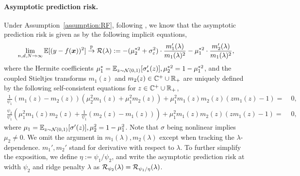 \documentclass{article} %
\begin{document}
\paragraph{Asymptotic prediction risk.} 
Under Assumption~\ref{assumption:RF}, following \cite{hu2022universality}, we know that the asymptotic prediction risk is given as by the following implicit equations,  
\begin{align*}
    \lim_{n,d,N\to\infty} \mathbb{E}[(y-f({\boldsymbol x}))^2] \overset{\mathbb{P}}{\to} {\mathcal R}(\lambda) := - (\mu_2^{*2} + \sigma_\varepsilon^2)\cdot \frac{m_1'(\lambda)}{m_1(\lambda)^2} - \mu_1^{*2} \cdot \frac{m_2'(\lambda)}{m_1(\lambda)^2},
\end{align*}
where the Hermite coefficients $\mu_1^* = \mathbb{E}_{z\sim{\mathcal N}(0,1)}[\sigma_*'(z)],  \mu_2^{*2} = 1-\mu_1^{*2}$, and the coupled Stieltjes transforms $m_1(z)$ and $m_2(z)\in\mathbb{C}^+\cup \mathbb{R}_{+}$ are uniquely defined by the following self-consistent equations for $z\in\mathbb{C}^+\cup \mathbb{R}_{+}$,
\begin{align}
    \frac{1}{\psi_1}(m_1(z)-m_2(z))(\mu_2^2m_1(z)+\mu_1^2m_2(z))+\mu_1^2m_1(z)m_2(z)\left(zm_1(z)-1\right)=& ~0, \label{eq:stieltjes1}\\
    \frac{\psi_2}{\psi_1}\left(\mu_1^2m_1(z)m_2(z)+\frac{1}{\psi_1}(m_2(z)-m_1(z))\right)+\mu_1^2m_1(z)m_2(z)\left(zm_1(z)-1\right)=& ~0, \label{eq:stieltjes2}
\end{align}
where $\mu_1 = \mathbb{E}_{z\sim{\mathcal N}(0,1)}[\sigma'(z)], \mu_2^2 = 1-\mu_1^2$. Note that $\sigma$ being nonlinear implies $\mu_2\neq 0$. We omit the argument in $m_1(\lambda),m_2(\lambda)$ except when tracking the $\lambda$-dependence. $m_1',m_2'$ stand for derivative with respect to $\lambda$. 
To further simplify the exposition, we define  $\eta:=\psi_1/\psi_2$, and write the asymptotic prediction risk at width $\psi_2$ and ridge penalty $\lambda$ as ${\mathcal R}_{\psi_2}(\lambda) = {\mathcal R}_{\psi_1/\eta}(\lambda)$. 
\end{document}
